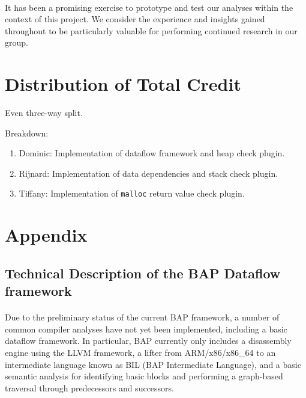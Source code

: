 \documentclass[letterpaper,11pt]{article}
\begin{document}
\paragraph{}
It has been a promising exercise to prototype and test our
analyses within the context of this project. We consider the experience and
insights gained throughout to be particularly valuable for performing continued
research in our group.

\section{Distribution of Total Credit}
Even three-way split.

Breakdown:
\begin{enumerate}
 \item Dominic: Implementation of dataflow framework and heap check plugin.
 \item Rijnard: Implementation of data dependencies and stack check plugin.
 \item Tiffany: Implementation of \texttt{malloc} return value check plugin.
\end{enumerate}

\clearpage

\appendix
\section{Appendix}
\label{appa1}
\subsection{Technical Description of the BAP Dataflow framework}

\paragraph{}
Due to the preliminary status of the current BAP framework, a number of common
compiler analyses have not yet been implemented, including a basic dataflow
framework. In particular, BAP currently only includes a disassembly engine
using the LLVM framework, a lifter from ARM/x86/x86\_64 to an intermediate
language known as BIL (BAP Intermediate Language), and a basic semantic
analysis for identifying basic blocks and performing a graph-based traversal
through predecessors and successors.
\end{document}
